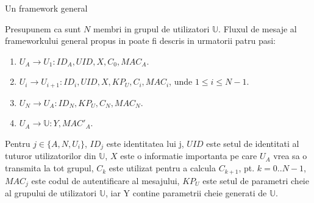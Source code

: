 \documentclass[11pt]{beamer}
\begin{document}
\begin{frame}{Un framework general}

Presupunem ca sunt $N$ membri in grupul de utilizatori $\mathbb{U}$. Fluxul de mesaje al frameworkului general propus in \cite{generalframework} poate fi descris in urmatorii patru pasi:
\begin{enumerate}

\item $U_A \rightarrow U_1: ID_A, UID, X, C_0, MAC_A$.

\item $U_i \rightarrow U_{i+1}: ID_i, UID, X, KP_U, C_i, MAC_i$, unde $1 \leq i \leq N - 1$.

\item $U_N \rightarrow U_A: ID_N, KP_U, C_N, MAC_N$.

\item $U_A \rightarrow \mathbb{U}: Y, MAC'_A$.

\end{enumerate}
Pentru $j \in \{A,N,U_i\}$, 
$ID_j$ este identitatea lui j, $UID$ este setul de identitati al tuturor utilizatorilor din $\mathbb{U}$, $X$ este o informatie importanta pe care $U_A$ vrea sa o transmita la tot grupul, $C_k$ este utilizat pentru a calcula $C_{k+1}$, pt. $k=0..N-1$, $MAC_j$ este codul de autentificare al mesajului, $KP_U$ este setul de parametri cheie al grupului de utilizatori $\mathbb{U}$, iar Y contine parametrii cheie generati de $\mathbb{U}$.

\end{frame}
\end{document}
